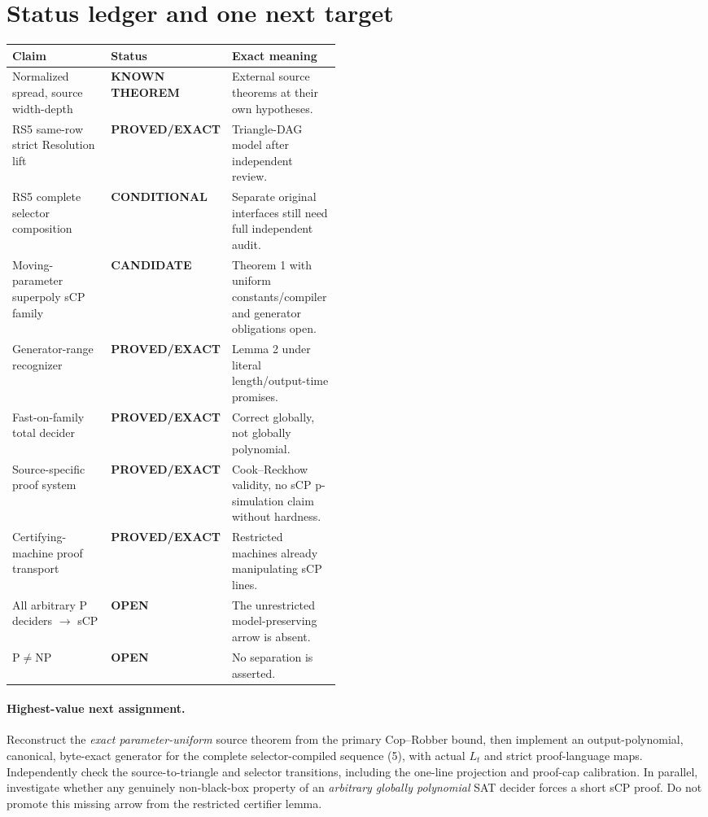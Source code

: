 \documentclass[11pt]{article}
\newcommand{\EXACT}{\textbf{PROVED/EXACT}}
\newcommand{\KNOWN}{\textbf{KNOWN THEOREM}}
\newcommand{\COND}{\textbf{CONDITIONAL}}
\newcommand{\CAND}{\textbf{CANDIDATE}}
\newcommand{\OPEN}{\textbf{OPEN}}
\begin{document}
\section{Status ledger and one next target}
\begin{center}\small
\begin{tabularx}{\linewidth}{p{0.30\linewidth}p{0.17\linewidth}X}
\toprule Claim & Status & Exact meaning\\\midrule
Normalized spread, source width-depth & \KNOWN &
External source theorems at their own hypotheses.\\
RS5 same-row strict Resolution lift & \EXACT &
Triangle-DAG model after independent review.\\
RS5 complete selector composition & \COND &
Separate original interfaces still need full independent audit.\\
Moving-parameter superpoly sCP family & \CAND &
Theorem 1 with uniform constants/compiler and generator obligations open.\\
Generator-range recognizer & \EXACT &
Lemma 2 under literal length/output-time promises.\\
Fast-on-family total decider & \EXACT &
Correct globally, not globally polynomial.\\
Source-specific proof system & \EXACT &
Cook--Reckhow validity, no sCP p-simulation claim without hardness.\\
Certifying-machine proof transport & \EXACT &
Restricted machines already manipulating sCP lines.\\
All arbitrary P deciders $\to$ sCP & \OPEN &
The unrestricted model-preserving arrow is absent.\\
$\mathrm P\ne\mathrm{NP}$ & \OPEN &
No separation is asserted.\\
\bottomrule
\end{tabularx}
\end{center}
\paragraph{Highest-value next assignment.}
Reconstruct the \emph{exact parameter-uniform} source theorem from
the primary Cop--Robber bound, then implement an output-polynomial,
canonical, byte-exact generator for the complete selector-compiled
sequence (5), with actual $L_t$ and strict proof-language maps.
Independently check the source-to-triangle and selector transitions,
including the one-line projection and proof-cap calibration.
In parallel, investigate whether any genuinely non-black-box
property of an \emph{arbitrary globally polynomial} SAT decider
forces a short sCP proof. Do not promote this missing arrow from
the restricted certifier lemma.
\end{document}
